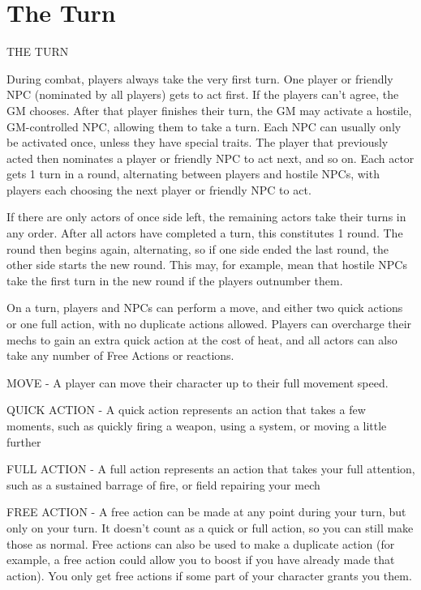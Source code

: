 \chapter{The Turn}
                                                THE TURN




During combat, players always take the very first turn. One player or friendly NPC (nominated
by all players) gets to act first. If the players can’t agree, the GM chooses. After that player
finishes their turn, the GM may activate a hostile, GM-controlled NPC, allowing them to take a
turn. Each NPC can usually only be activated once, unless they have special traits. The player
that previously acted then nominates a player or friendly NPC to act next, and so on. Each
actor gets 1 turn in a round, alternating between players and hostile NPCs, with players each
choosing the next player or friendly NPC to act.


If there are only actors of once side left, the remaining actors take their turns in any order. After
all actors have completed a turn, this constitutes 1 round. The round then begins again,
alternating, so if one side ended the last round, the other side starts the new round. This may, for
example, mean that hostile NPCs take the first turn in the new round if the players outnumber
them.

On a turn, players and NPCs can perform a move, and either two quick actions or one full
action, with no duplicate actions allowed. Players can overcharge their mechs to gain an extra
quick action at the cost of heat, and all actors can also take any number of Free Actions or
reactions.


MOVE - A player can move their character up to their full movement speed.

QUICK ACTION - A quick action represents an action that takes a few moments, such as
quickly firing a weapon, using a system, or moving a little further

FULL ACTION - A full action represents an action that takes your full attention, such as a
sustained barrage of fire, or field repairing your mech

FREE ACTION - A free action can be made at any point during your turn, but only on your turn. It
doesn’t count as a quick or full action, so you can still make those as normal. Free actions can
also be used to make a duplicate action (for example, a free action could allow you to boost if
you have already made that action). You only get free actions if some part of your character
grants you them.

